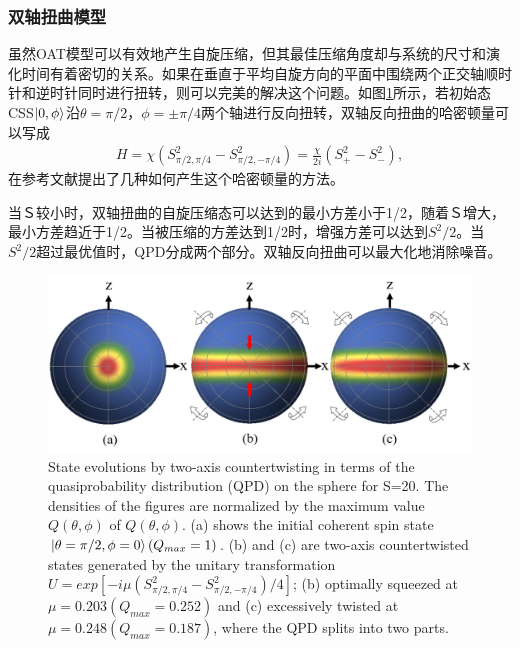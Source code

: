 \subsubsection{双轴扭曲模型}

虽然OAT模型可以有效地产生自旋压缩，但其最佳压缩角度却与系统的尺寸和演化时间有着密切的关系。如果在垂直于平均自旋方向的平面中围绕两个正交轴顺时针和逆时针同时进行扭转，则可以完美的解决这个问题。如图\ref{figure6}所示，若初始态CSS$\ket{0,\phi}$沿$\theta=\pi/2$，$\phi=\pm \pi/4$两个轴进行反向扭转，双轴反向扭曲的哈密顿量可以写成
\begin{align}
	H  = \chi(S_{\pi/2,\pi/4}^2-S_{\pi/2,-\pi/4}^2)
	= \frac{\chi}{2i}(S_+^2-S_-^2),\label{eq3338}
\end{align}
在参考文献\cite{helmerson2001creating,zhang2003entanglement,wesenberg2002mixed}提出了几种如何产生这个哈密顿量的方法。

当Ｓ较小时，双轴扭曲的自旋压缩态可以达到的最小方差小于1/2，随着Ｓ增大，最小方差趋近于1/2。当被压缩的方差达到1/2时，增强方差可以达到$S^2/2$。当$S^2/2$超过最优值时，QPD分成两个部分。双轴反向扭曲可以最大化地消除噪音。
\begin{figure}[h!]
	\centering
	\includegraphics[scale=0.35]{Img/tat2.png}
	{State evolutions by two-axis countertwisting in terms of the quasiprobability distribution (QPD) on the sphere for S=20. 
		The densities of the figures are normalized by the maximum value $Q(\theta,\phi)$ of $Q(\theta,\phi)$. 
		(a) shows the initial coherent spin state $\ket{\theta=\pi/2,\phi=0}(Q_{max}=1)$. 
		(b) and (c) are two-axis countertwisted states generated by the unitary transformation $U=exp[-i\mu(S_{\pi/2,\pi/4}^2-S_{\pi/2,-\pi/4}^2)/4]$; 
		(b) optimally squeezed at $\mu=0.203(Q_{max}=0.252)$ and (c) excessively twisted at $\mu=0.248(Q_{max}=0.187)$, where the QPD splits into two parts.}
	\label{figure6}
\end{figure}

